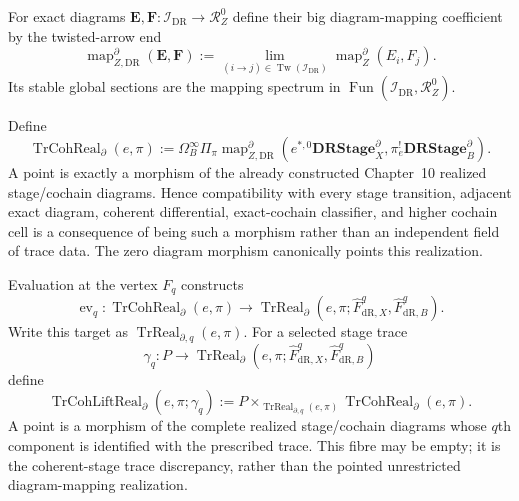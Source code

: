 For exact diagrams $\mathbf E,\mathbf F:\mathcal I_{\mathrm{DR}}\to\mathcal R_Z^0$
define their big diagram-mapping coefficient by the twisted-arrow end
\[
\boxed{
\operatorname{map}^{\partial}_{Z,\mathrm{DR}}
(\mathbf E,\mathbf F)
:=
\lim_{(i\to j)\in\operatorname{Tw}(\mathcal I_{\mathrm{DR}})}
\operatorname{map}^{\partial}_Z(E_i,F_j).
}
\]
Its stable global sections are the mapping spectrum in
$\operatorname{Fun}(\mathcal I_{\mathrm{DR}},\mathcal R_Z^0)$.

\begin{definition}
\label{def:prequantum-coherent-stage-trace-realization}
Define
\[
\boxed{
\operatorname{TrCohReal}_{\partial}(e,\pi)
:=
\Omega_B^\infty\Pi_\pi
\operatorname{map}^{\partial}_{Z,\mathrm{DR}}
\left(
 e^{*,0}\mathbf{DRStage}^{\partial}_X,
 \pi_e^!\mathbf{DRStage}^{\partial}_B
\right).
}
\]
A point is exactly a morphism of the already constructed Chapter~10 realized
stage/cochain diagrams.  Hence compatibility with every stage transition,
adjacent exact diagram, coherent differential, exact-cochain classifier, and
higher cochain cell is a consequence of being such a morphism rather than an
independent field of trace data.
The zero diagram morphism canonically points this realization.
\end{definition}

\begin{definition}
\label{def:prequantum-coherent-stage-trace-lift-realization}
Evaluation at the vertex $F_q$ constructs
\[
\operatorname{ev}_q:
\operatorname{TrCohReal}_{\partial}(e,\pi)
\longrightarrow
\operatorname{TrReal}_{\partial}
\left(e,\pi;\widehat F^q_{\mathrm{dR},X},
                 \widehat F^q_{\mathrm{dR},B}\right).
\]
Write this target as $\operatorname{TrReal}_{\partial,q}(e,\pi)$.
For a selected stage trace
\[
\gamma_q:P\longrightarrow
\operatorname{TrReal}_{\partial}
\left(e,\pi;\widehat F^q_{\mathrm{dR},X},
                 \widehat F^q_{\mathrm{dR},B}\right)
\]
define
\[
\boxed{
\operatorname{TrCohLiftReal}_{\partial}(e,\pi;\gamma_q)
:=
P\times_{\operatorname{TrReal}_{\partial,q}(e,\pi)}
\operatorname{TrCohReal}_{\partial}(e,\pi).
}
\]
A point is a morphism of the complete realized stage/cochain diagrams whose
$q$th component is identified with the prescribed trace.  This fibre may be
empty; it is the coherent-stage trace discrepancy, rather than the pointed
unrestricted diagram-mapping realization.
\end{definition}

